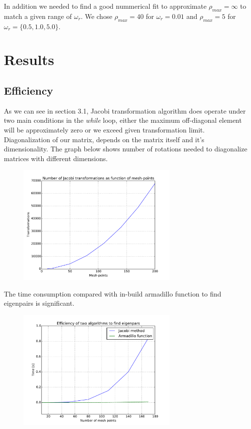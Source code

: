 \documentclass[a4paper, 10pt]{article}
\begin{document}
In addition we needed to find a good nummerical fit to approximate \(\rho_{max}=\infty\) to match
a given range of \(\omega_{r}\). We chose \(\rho_{max} = 40\) for \(\omega_{r}
= 0.01\) and \(\rho_{max}= 5\) for \(\omega_{r} = \{0.5, 1.0, 5.0\}\).
\section{Results}

\subsection{Efficiency}
As we can see in section 3.1, Jacobi
transformation algorithm does operate under two main conditions in the
\textit{while} loop, either the
maximum off-diagonal element will be approximately zero or we exceed given
transformation limit.  Diagonalization of our matrix, depends on the matrix
itself and it's dimensionality. The graph below shows number of rotations
needed to diagonalize matrices with different dimensions.
\begin{figure}[h!]
  \centering
  \includegraphics[width=8cm]{transformations.pdf}
  \caption{}
\end{figure}

The time consumption compared with in-build armadillo function to find
eigenpairs is significant.



\begin{figure}[h!]
  \centering
  \includegraphics[width=8cm]{timePlot.pdf}
  \caption{}
\end{figure}
\end{document}
